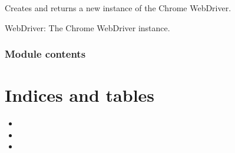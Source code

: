 \documentclass[letterpaper,10pt,english]{sphinxmanual}
\begin{document}
\begin{fulllineitems}
\label{\detokenize{utils:utils.webdriver_setup.driver}}
\pysigstartsignatures
{}
\pysigstopsignatures
\sphinxAtStartPar
Creates and returns a new instance of the Chrome WebDriver.
\begin{description}
\sphinxAtStartPar
WebDriver: The Chrome WebDriver instance.

\end{description}

\end{fulllineitems}



\subsection{Module contents}
\label{\detokenize{utils:module-utils}}\label{\detokenize{utils:module-contents}}

\chapter{Indices and tables}
\label{\detokenize{index:indices-and-tables}}\begin{itemize}
\item {} 
\sphinxAtStartPar
{}

\item {} 
\sphinxAtStartPar
{}

\item {} 
\sphinxAtStartPar
{}

\end{itemize}
\end{document}

